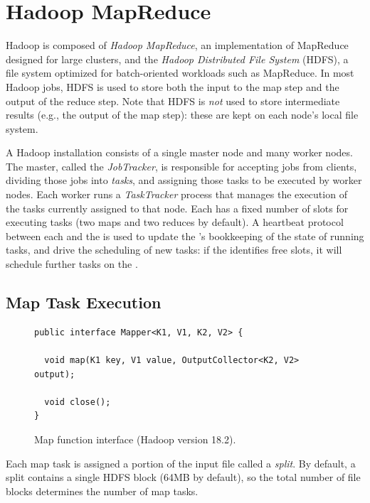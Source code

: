 \section{Hadoop MapReduce}
\label{ch:hadoop:sec:hadoop}

Hadoop is composed of {\em Hadoop MapReduce}, an implementation of MapReduce
designed for large clusters, and the {\em Hadoop Distributed File System}
(HDFS), a file system optimized for batch-oriented workloads such as MapReduce.
In most Hadoop jobs, HDFS is used to store both the input to the map step and
the output of the reduce step.  Note that HDFS is {\em not} used to store
intermediate results (e.g., the output of the map step): these are kept on each
node's local file system.

A Hadoop installation consists of a single master node and many worker nodes.
The master, called the {\em JobTracker}, is responsible for accepting jobs
from clients, dividing those jobs into {\em tasks}, and assigning those tasks
to be executed by worker nodes.  Each worker runs a {\em TaskTracker} process
that manages the execution of the tasks currently assigned to that node.  Each
{\TT} has a fixed number of slots for executing tasks (two maps and two reduces
by default).  A heartbeat protocol between each {\TT} and the {\JT} is used to
update the {\JT}'s bookkeeping of the state of running tasks, and drive the
scheduling of new tasks: if the \JT identifies free {\TT} slots, it will
schedule further tasks on the {\TT}.

\subsection{Map Task Execution}
\label{ch:hadoop:sec:maptask}

\begin{figure}[t]
\ssp
\begin{minipage}{\linewidth}
\centering
\begin{verbatim}
public interface Mapper<K1, V1, K2, V2> {
  
  void map(K1 key, V1 value, OutputCollector<K2, V2> output);

  void close();
}
\end{verbatim}
\end{minipage}
\caption{Map function interface (Hadoop version 18.2).}
\label{fig:mapfunction}
\end{figure}

Each map task is assigned a portion of the input file called a {\em split}.
By default, a split contains a single HDFS block (64MB by default), so the
total number of file blocks determines the number of map tasks.

